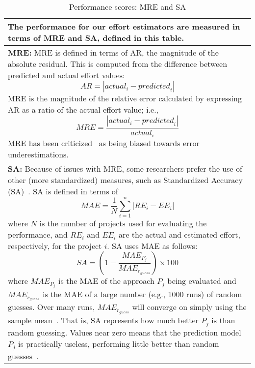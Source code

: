 \begin{table}
\caption{Performance scores: MRE and SA}\label{samre}
\begin{tabular}{|p{.95\linewidth}|}\hline
The performance   for our effort estimators are measured in terms of MRE and SA, defined in this table.
\\\hline
{\bf MRE:}
MRE is defined in terms of 
AR,  the magnitude of the absolute residual. This is  computed from the difference between predicted and actual effort values:
\[
\mathit{AR} = |\mathit{actual}_i - \mathit{predicted}_i|
\] 
MRE is the magnitude of the relative error calculated by expressing AR as a ratio of the actual effort value; i.e., 
\[
\mathit{MRE} = \frac{|\mathit{actual}_i - \mathit{predicted}_i|}{\mathit{actual}_i}
\]
MRE has been criticized~\cite{foss2003simulation,kitchenham2001accuracy,korte2008confidence,port2008comparative,shepperd2000building,stensrud2003further} as being biased towards error underestimations. 
\\\hline
{\bf SA:}
Because of issues with MRE, some researchers prefer the 
use of other (more standardized) measures, such as  Standardized Accuracy (SA)~\cite{langdon2016exact,shepperd2012evaluating}.
SA is defined in terms of 
\[
\mathit{MAE}=\frac{1}{N}\sum_{i=1}^n|\mathit{RE}_i-\mathit{EE}_i|
\]
where $N$ is the number of projects used for evaluating the performance, and $\mathit{RE}_i$ and $\mathit{EE}_i$ are the actual and estimated effort, respectively, for the project $i$. 
SA uses MAE as follows:
\[
\mathit{SA} = (1-\frac{\mathit{MAE}_{P_{j}}}{\mathit{MAE}_{r_{guess}}})\times 100
\]
where $\mathit{MAE}_{P_{j}}$ is the MAE of the approach $P_j$ being evaluated and $\mathit{MAE}_{r_{\mathit{guess}}}$ is the MAE of a large number (e.g., 1000 runs) of random guesses. 
Over many runs,  $\mathit{MAE}_{r_{\mathit{guess}}}$ will converge on simply using the sample mean~\cite{shepperd2012evaluating}. That is, SA represents how much better $P_j$ is than random guessing. Values near zero means that the prediction model $P_j$ is practically useless, performing little better than  random guesses~\cite{shepperd2012evaluating}. \\\hline
\end{tabular}
\end{table}